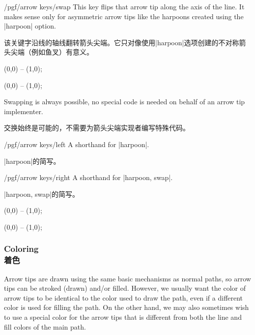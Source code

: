 \begin{key}{/pgf/arrow keys/swap}
    This key flips that arrow tip along the axis of the line. It makes sense
    only for asymmetric arrow tips like the harpoons created using the
    |harpoon| option.

    该关键字沿线的轴线翻转箭头尖端。它只对像使用|harpoon|选项创建的不对称箭头尖端（例如鱼叉）有意义。
\begin{codeexample}[width=3cm,preamble={\usetikzlibrary{arrows.meta}}]
 \draw [arrows = {-Stealth[harpoon]}] (0,0) -- (1,0);
\end{codeexample}
\begin{codeexample}[width=3cm,preamble={\usetikzlibrary{arrows.meta}}]
 \draw [arrows = {-Stealth[harpoon,swap]}] (0,0) -- (1,0);
\end{codeexample}
    Swapping is always possible, no special code is needed on behalf of an
    arrow tip implementer.

    交换始终是可能的，不需要为箭头尖端实现者编写特殊代码。
\end{key}

\begin{key}{/pgf/arrow keys/left}
    A shorthand for |harpoon|.

    |harpoon|的简写。
\end{key}

\begin{key}{/pgf/arrow keys/right}
    A shorthand for |harpoon, swap|.
    
    |harpoon, swap|的简写。
\begin{codeexample}[width=3cm,preamble={\usetikzlibrary{arrows.meta}}]
 \draw [arrows = {-Stealth[left]}] (0,0) -- (1,0);
\end{codeexample}
\begin{codeexample}[width=3cm,preamble={\usetikzlibrary{arrows.meta}}]
 \draw [arrows = {-Stealth[right]}] (0,0) -- (1,0);
\end{codeexample}
\end{key}


\subsubsection{Coloring\\着色}

Arrow tips are drawn using the same basic mechanisms as normal paths, so arrow
tips can be stroked (drawn) and/or filled. However, we usually want the color
of arrow tips to be identical to the color used to draw the path, even if a
different color is used for filling the path. On the other hand, we may also
sometimes wish to use a special color for the arrow tips that is different from
both the line and fill colors of the main path.

